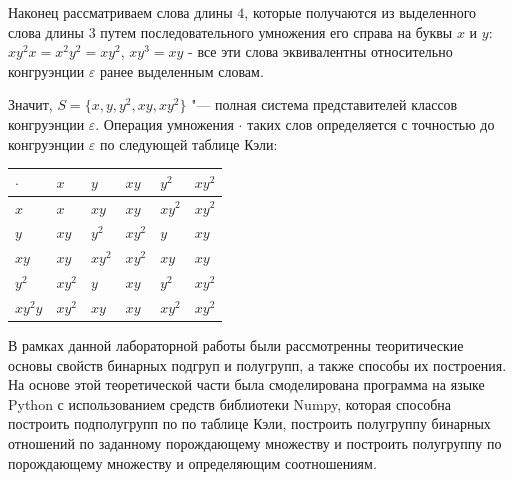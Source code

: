 \documentclass[spec, och, labwork]{shiza}
\begin{document}
        Наконец рассматриваем слова длины $4$, которые получаются из выделенного слова длины $3$ путем последовательного
        умножения его справа на буквы $x$ и $y$: $xy^2x = x^2y^2 = xy^2$, $xy^3 = xy$ - все эти слова эквивалентны
        относительно конгруэнции $\varepsilon$ ранее выделенным словам.

        Значит, $S = \{x, y, y^2, xy, xy^2 \}$ "--- полная система представителей классов конгруэнции $\varepsilon$.
        Операция умножения $\cdot$ таких слов определяется с точностью до конгруэнции $\varepsilon$ по следующей таблице
        Кэли:
        
        \begin{table}[h]
          \begin{center}
          \begin{tabular}{|l|l|l|l|l|l|}
          \hline
          $\cdot $ & $x$ & $y$  & $xy$  & $y^2$ & $xy^2$ \\ \hline
          $x$      & $x$ & $xy$ & $xy$  & $xy^2$ & $xy^2$ \\ \hline
          $y$      & $xy$& $y^2$ & $xy^2$ & $y$ & $xy$ \\ \hline
          $xy$    & $xy$ & $xy^2$ & $xy^2$ & $xy$ & $xy$ \\ \hline
          $y^2$     &$xy^2$& $y$ & $xy$ & $y^2$ & $xy^2$ \\ \hline
          $xy^2y$   & $xy^2$ &  $xy$  &  $xy$ & $xy^2$ & $xy^2$ \\ \hline
          \end{tabular}
          \end{center}
        \end{table}


\conclusion

В рамках данной лабораторной работы были рассмотренны теоритические основы свойств бинарных подгруп и полугрупп, а также способы
их построения. На основе этой теоретической части была смоделирована программа на языке Python с 
использованием средств библиотеки Numpy, которая способна построить подполугрупп по по таблице Кэли, построить полугруппу
бинарных отношений по заданному порождающему множеству и построить полугруппу по порождающему множеству и определяющим соотношениям.
\end{document}
